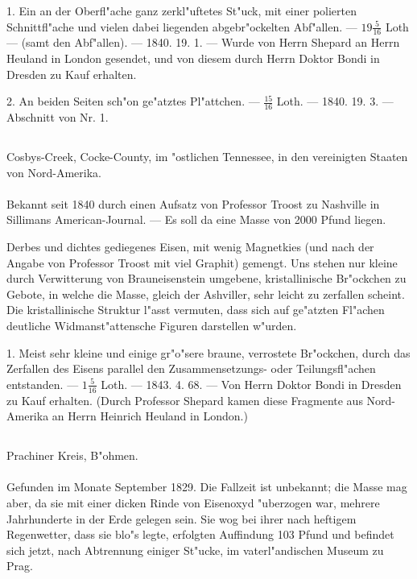 \documentclass[a4paper, 11pt, oneside, polutonikogreek, german]{article}
\begin{document}
1. Ein an der Oberfl"ache ganz zerkl"uftetes St"uck, mit einer polierten Schnittfl"ache und vielen dabei liegenden abgebr"ockelten Abf"allen. --- $\mathfrak{19\frac{5}{16}}$ Loth --- (samt den Abf"allen). --- 1840. 19. 1. --- Wurde von Herrn Shepard an Herrn Heuland in London gesendet, und von diesem durch Herrn Doktor Bondi in Dresden zu Kauf erhalten.

2. An beiden Seiten sch"on ge"atztes Pl"attchen. --- $\mathfrak{\frac{15}{16}}$ Loth. --- 1840. 19. 3. --- Abschnitt von Nr. 1.
\subsection{}
\begin{center}

Cosbys-Creek, Cocke-County, im "ostlichen Tennessee, in den vereinigten Staaten von Nord-Amerika.
\end{center}
\paragraph{}
Bekannt seit 1840 durch einen Aufsatz von Professor Troost zu Nashville in Sillimans American-Journal. --- Es soll da eine Masse von 2000 Pfund liegen.

Derbes und dichtes gediegenes Eisen, mit wenig Magnetkies (und nach der Angabe von Professor Troost mit viel Graphit) gemengt. Uns stehen nur kleine durch Verwitterung von Brauneisenstein umgebene, kristallinische Br"ockchen zu Gebote, in welche die Masse, gleich der Ashviller, sehr leicht zu zerfallen scheint. Die kristallinische Struktur l"asst vermuten, dass sich auf ge"atzten Fl"achen deutliche Widmanst"attensche Figuren darstellen w"urden.

1. Meist sehr kleine und einige gr"o"sere braune, verrostete Br"ockchen, durch das Zerfallen des Eisens parallel den Zusammensetzungs- oder Teilungsfl"achen entstanden. --- $\mathfrak{1\frac{5}{16}}$ Loth. --- 1843. 4. 68. --- Von Herrn Doktor Bondi in Dresden zu Kauf erhalten. (Durch Professor Shepard kamen diese Fragmente aus Nord-Amerika an Herrn Heinrich Heuland in London.)
\subsection{}
\begin{center}

Prachiner Kreis, B"ohmen.
\end{center}
\paragraph{}
Gefunden im Monate September 1829. Die Fallzeit ist unbekannt; die Masse mag aber, da sie mit einer dicken Rinde von Eisenoxyd "uberzogen war, mehrere Jahrhunderte in der Erde gelegen sein. Sie wog bei ihrer nach heftigem Regenwetter, dass sie blo"s legte, erfolgten Auffindung 103 Pfund und befindet sich jetzt, nach Abtrennung einiger St"ucke, im vaterl"andischen Museum zu Prag.
\end{document}
